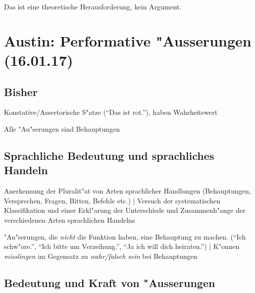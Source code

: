 \documentclass[emulatestandardclasses]{scrartcl}
\begin{document}
Das ist eine theoretische Herausforderung, kein Argument.

\section{Austin: Performative "Ausserungen\\(16.01.17)}

\subsection{Bisher}

\begin{description}[leftmargin=!,labelwidth=\widthof{\bfseries Ausgangspunkt}]
    \item[Sprachlicher Ausdruck] Konstative/Assertorische S"atze ("`Das ist rot."'), haben Wahrheitswert
    \item[Fehlschluss] Alle "Au"serungen sind Behauptungen
\end{description}

\subsection{Sprachliche Bedeutung und sprachliches Handeln}

\begin{description}[leftmargin=!,labelwidth=\widthof{\bfseries Performative "Au"serungen}]
    \item[Sprechakttheorie] Anerkennung der Pluralit"at von Arten sprachlicher Handlungen (Behauptungen, Versprechen, Fragen, Bitten, Befehle etc.) | Versuch der systematischen Klassifikation und einer Erkl"arung der Unterschiede und Zusammenh"ange der verschiedenen Arten sprachlichen Handelns 
    \item[Performative "Au"serungen] "Au"serungen, die \emph{nicht} die Funktion haben, eine Behauptung zu machen. ("`Ich schw"ore."', "`Ich bitte um Verzeihung."', "`Ja ich will dich heiraten."') | K"onnen \emph{misslingen} im Gegensatz zu \emph{wahr/falsch sein} bei Behauptungen
    \item[Performativit"at] 
\end{description}

\subsection{Bedeutung und Kraft von "Ausserungen}
\end{document}
